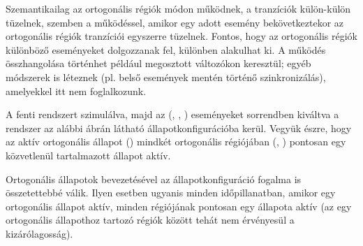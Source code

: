 Szemantikailag az ortogonális régiók  módon működnek, a tranzíciók külön-külön tüzelnek, szemben a  működéssel, amikor egy adott esemény bekövetkeztekor az ortogonális régiók tranzíciói egyszerre tüzelnek. Fontos, hogy az ortogonális régiók különböző eseményeket dolgozzanak fel, különben  alakulhat ki. A működés összhangolása történhet például megosztott változókon keresztül; egyéb módszerek is léteznek (pl. belső események mentén történő szinkronizálás), amelyekkel itt nem foglalkozunk. 

\begin{megjegyzes}
	A fenti rendszert szimulálva, majd az (, , ) eseményeket sorrendben kiváltva a rendszer az alábbi ábrán látható állapotkonfigurációba kerül. Vegyük észre, hogy az aktív ortogonális állapot () mindkét ortogonális régiójában (, ) pontosan egy közvetlenül tartalmazott állapot aktív.

\end{megjegyzes}

Ortogonális állapotok bevezetésével az állapotkonfiguráció fogalma is összetettebbé válik. Ilyen esetben ugyanis minden időpillanatban, amikor egy ortogonális állapot aktív, minden régiójának pontosan egy állapota aktív (az egy ortogonális állapothoz tartozó régiók között tehát nem érvényesül a kizárólagosság).

